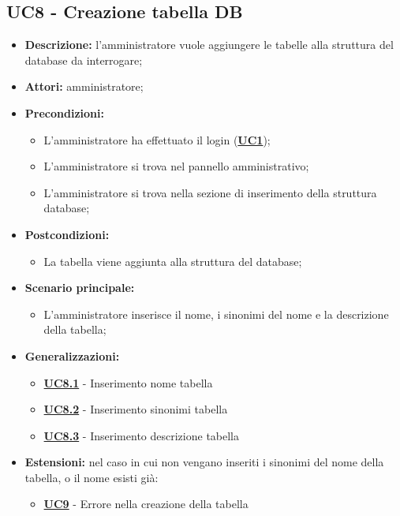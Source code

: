 \documentclass[5pt]{article}
\begin{document}
\subsection{UC8 - Creazione tabella DB}
\label{sec:UC8}
\begin{itemize}
	\item \textbf{Descrizione:} l’amministratore vuole aggiungere le tabelle alla struttura del database da interrogare;
	\item \textbf{Attori:} amministratore;
	\item \textbf{Precondizioni:} 
	\begin{itemize}
		\item L’amministratore ha effettuato il login (\hyperref[sec:UC1]{\textbf{UC1}});
		\item L’amministratore si trova nel pannello amministrativo;
		\item L’amministratore si trova nella sezione di inserimento della struttura database;
	\end{itemize}
	\item \textbf{Postcondizioni:} 
	\begin{itemize}
		\item La tabella viene aggiunta alla struttura del database;
	\end{itemize}
	\item \textbf{Scenario principale:} 
	\begin{itemize}
		\item L’amministratore inserisce il nome, i sinonimi del nome e la descrizione della tabella;
	\end{itemize}
	\item \textbf{Generalizzazioni:} 
	\begin{itemize}
		\item \hyperref[sec:UC8.1]{\textbf{UC8.1}} - Inserimento nome tabella
		\item \hyperref[sec:UC8.2]{\textbf{UC8.2}} - Inserimento sinonimi tabella
		\item \hyperref[sec:UC8.3]{\textbf{UC8.3}} - Inserimento descrizione tabella
	\end{itemize}
	\item \textbf{Estensioni:} nel caso in cui non vengano inseriti i sinonimi del nome della tabella, o il nome esisti già:
	\begin{itemize}
		\item \hyperref[sec:UC9]{\textbf{UC9}} - Errore nella creazione della tabella
	\end{itemize}
\end{itemize}
\end{document}
